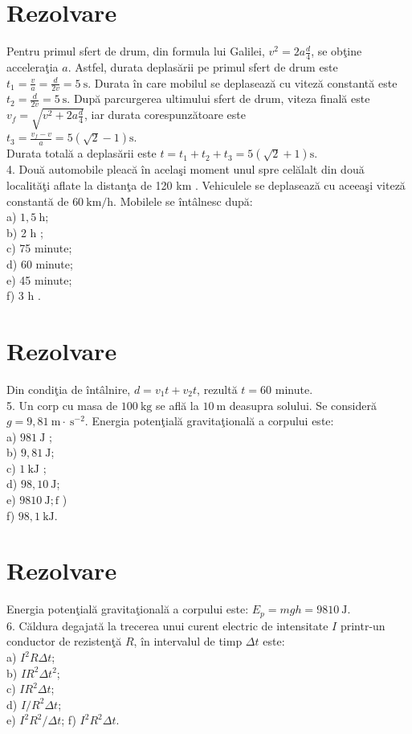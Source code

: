 \section*{Rezolvare}
Pentru primul sfert de drum, din formula lui Galilei, $v^{2}=2 a \frac{d}{4}$, se obţine acceleraţia $a$. Astfel, durata deplasării pe primul sfert de drum este $t_{1}=\frac{v}{a}=\frac{d}{2 v}=5 \mathrm{~s}$. Durata în care mobilul se deplasează cu viteză constantă este $t_{2}=\frac{d}{2 v}=5 \mathrm{~s}$. După parcurgerea ultimului sfert de drum, viteza finală este $v_{f}=\sqrt{v^{2}+2 a \frac{d}{4}}$, iar durata corespunzătoare este\\
$t_{3}=\frac{v_{f}-v}{a}=5(\sqrt{2}-1) \mathrm{s}$.\\
Durata totală a deplasării este $t=t_{1}+t_{2}+t_{3}=5(\sqrt{2}+1) \mathrm{s}$.\\
4. Două automobile pleacă în acelaşi moment unul spre celălalt din două localităţi aflate la distanţa de 120 km . Vehiculele se deplasează cu aceeaşi viteză constantă de $60 \mathrm{~km} / \mathrm{h}$. Mobilele se întâlnesc după:\\
a) $1,5 \mathrm{~h}$;\\
b) 2 h ;\\
c) 75 minute;\\
d) 60 minute;\\
e) 45 minute;\\
f) 3 h .

\section*{Rezolvare}
Din condiţia de întâlnire, $d=v_{1} t+v_{2} t$, rezultă $t=60$ minute.\\
5. Un corp cu masa de $100 \mathrm{~kg}$ se află la $10 \mathrm{~m}$ deasupra solului. Se consideră $g=9,81 \mathrm{~m} \cdot \mathrm{~s}^{-2}$. Energia potenţială gravitaţională a corpului este:\\
a) $981 \mathrm{~J}$ ;\\
b) $9,81 \mathrm{~J}$;\\
c) $1 \mathrm{~kJ}$ ;\\
d) $98,10 \mathrm{~J}$;\\
e) $9810 \mathrm{~J} ; \mathrm{f}$ )\\
f) $98,1 \mathrm{~kJ}$.

\section*{Rezolvare}
Energia potenţială gravitaţională a corpului este: $E_{p}=m g h=9810 \mathrm{~J}$.\\
6. Căldura degajată la trecerea unui curent electric de intensitate $I$ printr-un conductor de rezistenţă $R$, în intervalul de timp $\Delta t$ este:\\
a) $I^{2} R \Delta t$;\\
b) $I R^{2} \Delta t^{2}$;\\
c) $I R^{2} \Delta t$;\\
d) $I / R^{2} \Delta t$;\\
e) $I^{2} R^{2} / \Delta t$; f) $I^{2} R^{2} \Delta t$.

